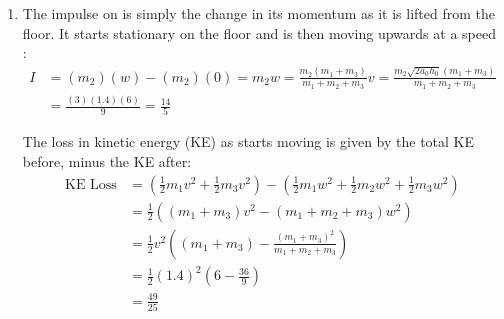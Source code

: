\begin{problem}[A1969AMIIQ2a]
{\begin{enumerate}
		This is not the final answer, since just after the string goes taut  will be moving as well. To find the final speed, , all three masses have immediately after the string goes taut, conserve momentum:
		\begin{eqnarray*} 
			(m_{1} + m_{3})(v) + (m_{2})(0) = (m_{1} + m_{2} + m_{3})(w) 
		\end{eqnarray*}
		\begin{eqnarray*}
 			w = \frac{m_{1} + m_{3}}{m_{1} + m_{2} + m_{3}} v 
		 \end{eqnarray*}

		\item The impulse on  is simply the change in its momentum as it is lifted from the floor. It starts stationary on the floor and is then moving upwards at a speed :
		\begin{eqnarray*} 
			I &= (m_{2})(w) - (m_{2})(0) = m_{2}w = \frac{m_{2} \left(m_{1} + m_{3} \right)}{m_{1} + m_{2} + m_{3}} v = \frac{m_{2} \sqrt{2a_{0}h_{0}} \left(m_{1} + m_{3} \right)}{m_{1} + m_{2} + m_{3}} \\ 
			&= \frac{(3)(1.4)(6)}{9} = \frac{14}{5}
		\end{eqnarray*}

		The loss in kinetic energy (KE) as  starts moving is given by the total KE before, minus the KE after:
		\begin{eqnarray*} 
			\text{KE Loss} &= \left( \frac{1}{2}m_{1}v^{2} + \frac{1}{2}m_{3}v^{2} \right) - \left( \frac{1}{2}m_{1}w^{2} + \frac{1}{2}m_{2}w^{2} + \frac{1}{2}m_{3}w^{2} \right) \\ 
			&= \frac{1}{2} \left( (m_{1} + m_{3})v^{2} - (m_{1} + m_{2} + m_{3})w^{2} \right) \\ 
			&= \frac{1}{2}v^{2} \left( (m_{1} + m_{3}) - \frac{(m_{1} + m_{3})^{2}}{m_{1} + m_{2} + m_{3}} \right) \\ 
			&= \frac{1}{2}(1.4)^{2} \left( 6 - \frac{36}{9} \right) \\ 
			&= \frac{49}{25}
		\end{eqnarray*}
		\end{enumerate}
	
}
\end{problem}

